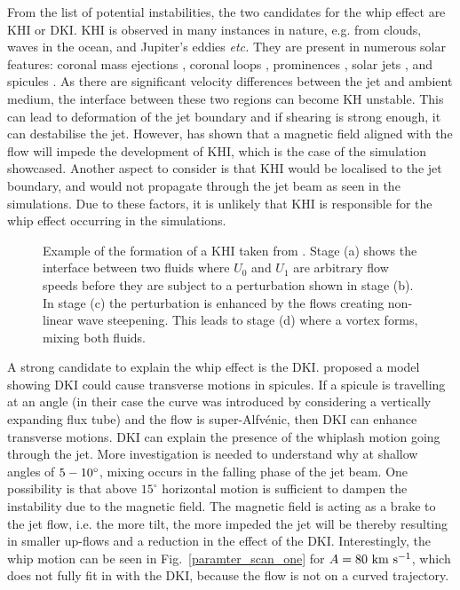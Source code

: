 From the list of potential instabilities, the two candidates for the whip effect are KHI or DKI. KHI is observed in many instances in nature, e.g. from clouds, waves in the ocean, and Jupiter's eddies \textit{etc.}  They are present in numerous solar features: coronal mass ejections \citep{Foullon2011ApJ729L8F, Foullon2013ApJ767170F}, coronal loops \citep{Barbulescu2019ApJ870108B}, prominences \citep{Berger2010ApJ7161288B, Ryutova2010SoPh26775R}, solar jets \citep{Filippov2015MNRAS4511117F,Li2018NatSR88136L}, and spicules \citep{Kuridze2016ApJ830133K, Antolin2018ApJ85644A}. As there are significant velocity differences between the jet and ambient medium, the interface between these two regions can become KH unstable. This can lead to deformation of the jet boundary and if shearing is strong enough, it can destabilise the jet. However, \cite{Chandrasekhar1961hhsbookC} has shown that a magnetic field aligned with the flow will impede the development of KHI, which is the case of the simulation showcased. Another aspect to consider is that KHI would be localised to the jet boundary, and would not propagate through the jet beam as seen in the simulations. Due to these factors, it is unlikely that KHI is responsible for the whip effect occurring in the simulations. \np 
\begin{figure}
\captionsetup[subfigure]{labelformat=empty}
\centering
{}
\caption{Example of the formation of a KHI taken from \cite{Barbulescu2018SoPh29386B}. Stage (a) shows the interface between two fluids where $U_0$ and $U_1$ are arbitrary flow speeds before they are subject to a perturbation shown in stage (b). In stage (c) the perturbation is enhanced by the flows creating non-linear wave steepening. This leads to stage (d) where a vortex forms, mixing both fluids.}
\label{KHI_example}
\end{figure}
A strong candidate to explain the whip effect is the DKI. \cite{Zaqarashvili2020ApJ893L46Z} proposed a model showing DKI could cause transverse motions in spicules. If a spicule is travelling at an angle (in their case the curve was introduced by considering a vertically expanding flux tube) and the flow is super-Alfv\'{e}nic, then DKI can enhance transverse motions. DKI can explain the presence of the whiplash motion going through the jet. More investigation is needed to understand why at shallow angles of $5-10^{\circ}$, mixing occurs in the falling phase of the jet beam. One possibility is that above $15^{\circ}$ horizontal motion is sufficient to dampen the instability due to the magnetic field. The magnetic field is acting as a brake to the jet flow, i.e. the more tilt, the more impeded the jet will be thereby resulting in smaller up-flows and a reduction in the effect of the DKI. Interestingly, the whip motion can be seen in Fig.~\ref{paramter_scan_one} for $A=80 ~\rm{km ~s^{-1}}$, which does not fully fit in with the DKI, because the flow is not on a curved trajectory. \np 
